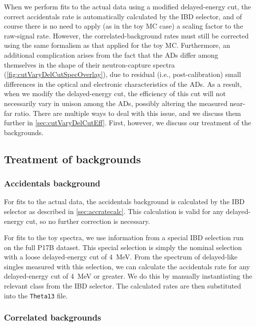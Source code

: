 \documentclass[../thesis.tex]{subfiles}
\begin{document}
When we perform fits to the actual data using a modified delayed-energy cut, the correct accidentals rate is automatically calculated by the IBD selector, and of course there is no need to apply (as in the toy MC case) a scaling factor to the raw-signal rate. However, the correlated-background rates must still be corrected using the same formalism as that applied for the toy MC\@.  Furthermore, an additional complication arises from the fact that the ADs differ among themselves in the shape of their neutron-capture spectra (\autoref{fig:cutVaryDelCutSpecOverlay}), due to residual (i.e., post-calibration) small differences in the optical and electronic characteristics of the ADs. As a result, when we modify the delayed-energy cut, the efficiency of this cut will not necessarily vary in unison among the ADs, possibly altering the measured near-far ratio. There are multiple ways to deal with this issue, and we discuss them further in \autoref{sec:cutVaryDelCutEff}. First, however, we discuss our treatment of the backgrounds.

\subsection{Treatment of backgrounds}
\label{sec:cutVaryDelayedCutBkgTreatment}

\subsubsection{Accidentals background}

For fits to the actual data, the accidentals background is calculated by the IBD selector as described in \autoref{sec:accratecalc}. This calculation is valid for any delayed-energy cut, so no further correction is necessary.

For fits to the toy spectra, we use information from a special IBD selection run on the full P17B dataset. This special selection is simply the nominal selection with a loose delayed-energy cut of 4~MeV. From the spectrum of delayed-like singles measured with this selection, we can calculate the accidentals rate for any delayed-energy cut of 4~MeV or greater. We do this by manually instantiating the relevant class from the IBD selector. The calculated rates are then substituted into the \texttt{Theta13} file.

\subsubsection{Correlated backgrounds}
\end{document}
